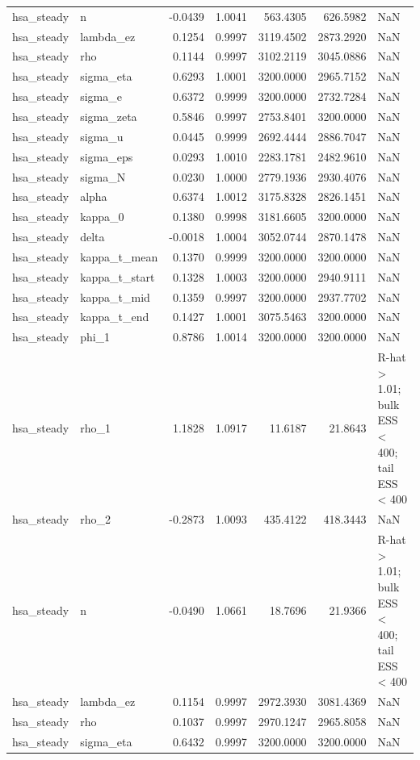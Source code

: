 \begin{tabular}{llrrrrl}
hsa\_steady & n & -0.0439 & 1.0041 & 563.4305 & 626.5982 & NaN \\
hsa\_steady & lambda\_ez & 0.1254 & 0.9997 & 3119.4502 & 2873.2920 & NaN \\
hsa\_steady & rho & 0.1144 & 0.9997 & 3102.2119 & 3045.0886 & NaN \\
hsa\_steady & sigma\_eta & 0.6293 & 1.0001 & 3200.0000 & 2965.7152 & NaN \\
hsa\_steady & sigma\_e & 0.6372 & 0.9999 & 3200.0000 & 2732.7284 & NaN \\
hsa\_steady & sigma\_zeta & 0.5846 & 0.9997 & 2753.8401 & 3200.0000 & NaN \\
hsa\_steady & sigma\_u & 0.0445 & 0.9999 & 2692.4444 & 2886.7047 & NaN \\
hsa\_steady & sigma\_eps & 0.0293 & 1.0010 & 2283.1781 & 2482.9610 & NaN \\
hsa\_steady & sigma\_N & 0.0230 & 1.0000 & 2779.1936 & 2930.4076 & NaN \\
hsa\_steady & alpha & 0.6374 & 1.0012 & 3175.8328 & 2826.1451 & NaN \\
hsa\_steady & kappa\_0 & 0.1380 & 0.9998 & 3181.6605 & 3200.0000 & NaN \\
hsa\_steady & delta & -0.0018 & 1.0004 & 3052.0744 & 2870.1478 & NaN \\
hsa\_steady & kappa\_t\_mean & 0.1370 & 0.9999 & 3200.0000 & 3200.0000 & NaN \\
hsa\_steady & kappa\_t\_start & 0.1328 & 1.0003 & 3200.0000 & 2940.9111 & NaN \\
hsa\_steady & kappa\_t\_mid & 0.1359 & 0.9997 & 3200.0000 & 2937.7702 & NaN \\
hsa\_steady & kappa\_t\_end & 0.1427 & 1.0001 & 3075.5463 & 3200.0000 & NaN \\
hsa\_steady & phi\_1 & 0.8786 & 1.0014 & 3200.0000 & 3200.0000 & NaN \\
hsa\_steady & rho\_1 & 1.1828 & 1.0917 & 11.6187 & 21.8643 & R-hat > 1.01; bulk ESS < 400; tail ESS < 400 \\
hsa\_steady & rho\_2 & -0.2873 & 1.0093 & 435.4122 & 418.3443 & NaN \\
hsa\_steady & n & -0.0490 & 1.0661 & 18.7696 & 21.9366 & R-hat > 1.01; bulk ESS < 400; tail ESS < 400 \\
hsa\_steady & lambda\_ez & 0.1154 & 0.9997 & 2972.3930 & 3081.4369 & NaN \\
hsa\_steady & rho & 0.1037 & 0.9997 & 2970.1247 & 2965.8058 & NaN \\
hsa\_steady & sigma\_eta & 0.6432 & 0.9997 & 3200.0000 & 3200.0000 & NaN \\

\end{tabular}
